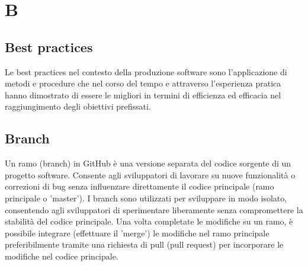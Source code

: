 \section{B} 
\subsection{Best practices} 
Le best practices nel contesto della produzione software sono l'applicazione di metodi e procedure che nel corso del tempo e attraverso l'esperienza pratica hanno dimostrato di essere le migliori in termini di efficienza ed efficacia nel raggiungimento degli obiettivi prefissati.
\subsection{Branch} 
Un ramo (branch) in GitHub è una versione separata del codice sorgente di un progetto software. Consente agli sviluppatori di lavorare su nuove funzionalità o correzioni di bug senza influenzare direttamente il codice principale (ramo principale o 'master'). I branch sono utilizzati per sviluppare in modo isolato, consentendo agli sviluppatori di sperimentare liberamente senza compromettere la stabilità del codice principale. Una volta completate le modifiche su un ramo, è possibile integrare (effettuare il 'merge') le modifiche nel ramo principale preferibilmente tramite una richiesta di pull (pull request) per incorporare le modifiche nel codice principale.
